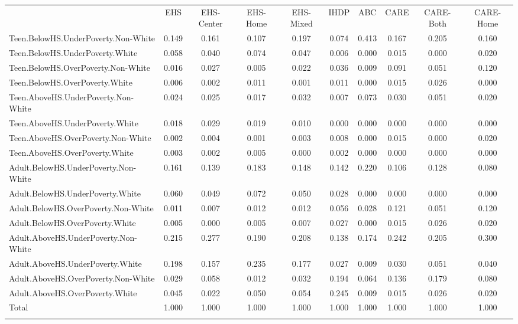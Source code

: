 \begin{tabular}{lccccccccc}
\hline \noalign{\smallskip} & EHS & EHS-Center & EHS-Home & EHS-Mixed & IHDP & ABC & CARE & CARE-Both & CARE-Home\\
\noalign{\smallskip}\hline \noalign{\smallskip}Teen.BelowHS.UnderPoverty.Non-White & 0.149 & 0.161 & 0.107 & 0.197 & 0.074 & 0.413 & 0.167 & 0.205 & 0.160\\
Teen.BelowHS.UnderPoverty.White & 0.058 & 0.040 & 0.074 & 0.047 & 0.006 & 0.000 & 0.015 & 0.000 & 0.020\\
Teen.BelowHS.OverPoverty.Non-White & 0.016 & 0.027 & 0.005 & 0.022 & 0.036 & 0.009 & 0.091 & 0.051 & 0.120\\
Teen.BelowHS.OverPoverty.White & 0.006 & 0.002 & 0.011 & 0.001 & 0.011 & 0.000 & 0.015 & 0.026 & 0.000\\
Teen.AboveHS.UnderPoverty.Non-White & 0.024 & 0.025 & 0.017 & 0.032 & 0.007 & 0.073 & 0.030 & 0.051 & 0.020\\
Teen.AboveHS.UnderPoverty.White & 0.018 & 0.029 & 0.019 & 0.010 & 0.000 & 0.000 & 0.000 & 0.000 & 0.000\\
Teen.AboveHS.OverPoverty.Non-White & 0.002 & 0.004 & 0.001 & 0.003 & 0.008 & 0.000 & 0.015 & 0.000 & 0.020\\
Teen.AboveHS.OverPoverty.White & 0.003 & 0.002 & 0.005 & 0.000 & 0.002 & 0.000 & 0.000 & 0.000 & 0.000\\
Adult.BelowHS.UnderPoverty.Non-White & 0.161 & 0.139 & 0.183 & 0.148 & 0.142 & 0.220 & 0.106 & 0.128 & 0.080\\
Adult.BelowHS.UnderPoverty.White & 0.060 & 0.049 & 0.072 & 0.050 & 0.028 & 0.000 & 0.000 & 0.000 & 0.000\\
Adult.BelowHS.OverPoverty.Non-White & 0.011 & 0.007 & 0.012 & 0.012 & 0.056 & 0.028 & 0.121 & 0.051 & 0.120\\
Adult.BelowHS.OverPoverty.White & 0.005 & 0.000 & 0.005 & 0.007 & 0.027 & 0.000 & 0.015 & 0.026 & 0.020\\
Adult.AboveHS.UnderPoverty.Non-White & 0.215 & 0.277 & 0.190 & 0.208 & 0.138 & 0.174 & 0.242 & 0.205 & 0.300\\
Adult.AboveHS.UnderPoverty.White & 0.198 & 0.157 & 0.235 & 0.177 & 0.027 & 0.009 & 0.030 & 0.051 & 0.040\\
Adult.AboveHS.OverPoverty.Non-White & 0.029 & 0.058 & 0.012 & 0.032 & 0.194 & 0.064 & 0.136 & 0.179 & 0.080\\
Adult.AboveHS.OverPoverty.White & 0.045 & 0.022 & 0.050 & 0.054 & 0.245 & 0.009 & 0.015 & 0.026 & 0.020\\
Total & 1.000 & 1.000 & 1.000 & 1.000 & 1.000 & 1.000 & 1.000 & 1.000 & 1.000\\
\noalign{\smallskip}\hline\end{tabular}\\
